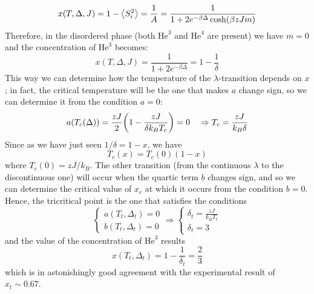 \documentclass[../../Main/Main.tex]{subfiles}
\begin{document}
\begin{equation*}
    x(T, \Delta , J) = 1 - \expval{S_i^2} = \frac{1}{A}= \frac{1}{ 1 + 2 e^{-\beta \Delta } \cosh (\beta z J m)}
\end{equation*}
Therefore, in the disordered phase (both 
\( \text{He}^3 \) and \( \text{He}^4 \) are present) we have \(m=0\) and the concentration of \( \text{He}^3 \) becomes:
\begin{equation}
  x (T,\Delta , J) = \frac{1}{1 + 2 e^{-\beta \Delta }}  = 1 - \frac{1}{\delta }
\end{equation}
This way we can determine how the temperature of the \(\lambda\)-transition depends on \(x\); in fact, the critical temperature will be the one that makes \(a\) change sign, so we can determine it from the condition \(a=0\):
\begin{equation*}
  a (T_c (\Delta )) = \frac{z J}{2} \qty(1 - \frac{z J}{\delta k_B T_c}) = 0 \quad \Rightarrow T_c = \frac{z J}{k_B \delta}
\end{equation*}
Since as we have just seen \(1/\delta = 1-x\), we have
\begin{equation}
  T_c (x) = T_c (0) (1-x)
\end{equation}
where \(T_c (0)=zJ/k_B \).
The other transition (from the continuous \(\lambda\) to the discontinuous one) will occur when the quartic term \(b\) changes sign, and so we can determine the critical value of \(x_c\) at which it occurs from the condition \(b=0\). Hence, the tricritical point is the one that satisfies the conditions
  \begin{equation*}
    \begin{cases}
     a (T_t, \Delta _t) = 0 \\
     b (T_t, \Delta _t) = 0
    \end{cases} \Rightarrow
    \begin{cases}
      \delta _t = \frac{zJ}{k_B T_t} \\
      \delta _t = 3
    \end{cases}
\end{equation*}
and the value of the concentration of \( \text{He}^3 \) results
\begin{equation}
  x (T_t, \Delta _t) = 1 - \frac{1}{\delta _t} = \frac{2}{3}
\end{equation}
which is in astonishingly good agreement with the experimental result of \(x_t \sim 0.67\).
\end{document}
